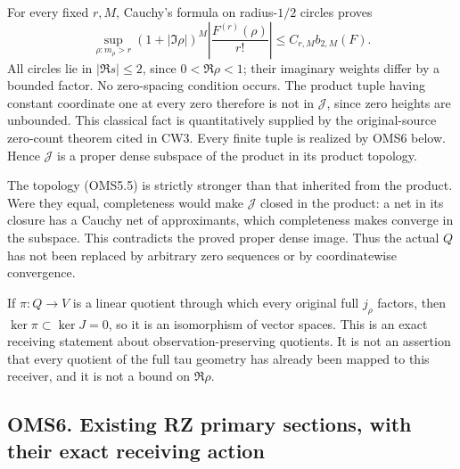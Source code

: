 For every fixed \(r,M\), Cauchy's formula on radius-\(1/2\) circles
proves \[
\sup_{\rho:m_\rho>r}(1+|\Im\rho|)^M
\left|\frac{F^{(r)}(\rho)}{r!}\right|
\le C_{r,M}b_{2,M}(F).
\tag{OMS5.6}
\] All circles lie in \(|\Re s|\le2\), since \(0<\Re\rho<1\); their
imaginary weights differ by a bounded factor. No zero-spacing condition
occurs. The product tuple having constant coordinate one at every zero
therefore is not in \(\mathscr J\), since zero heights are unbounded.
This classical fact is quantitatively supplied by the original-source
zero-count theorem cited in CW3. Every finite tuple is realized by OMS6
below. Hence \(\mathscr J\) is a proper dense subspace of the product in
its product topology.

The topology (OMS5.5) is strictly stronger than that inherited from the
product. Were they equal, completeness would make \(\mathscr J\) closed
in the product: a net in its closure has a Cauchy net of approximants,
which completeness makes converge in the subspace. This contradicts the
proved proper dense image. Thus the actual \(Q\) has not been replaced
by arbitrary zero sequences or by coordinatewise convergence.

If \(\pi:Q\to V\) is a linear quotient through which every original full
\(j_\rho\) factors, then \(\ker\pi\subset\ker J=0\), so it is an
isomorphism of vector spaces. This is an exact receiving statement about
observation-preserving quotients. It is not an assertion that every
quotient of the full tau geometry has already been mapped to this
receiver, and it is not a bound on \(\Re\rho\).

\subsection{OMS6. Existing RZ primary sections, with their exact
receiving
action}\label{oms6.-existing-rz-primary-sections-with-their-exact-receiving-action}

